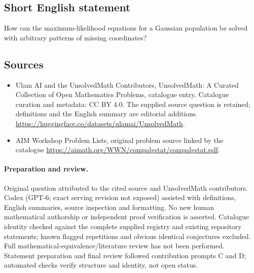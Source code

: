 \documentclass[11pt]{article}
\begin{document}
\subsection{Short English statement}
How can the maximum-likelihood equations for a Gaussian population be solved with arbitrary patterns of missing coordinates?
\subsection{Sources}
\begin{itemize}
\item[\hypertarget{source:statement:1}{S1}] Ulam AI and the UnsolvedMath Contributors, UnsolvedMath: A Curated Collection of Open Mathematics Problems, catalogue entry. Catalogue curation and metadata: CC BY 4.0. The supplied source question is retained; definitions and the English summary are editorial additions.
\url{https://huggingface.co/datasets/ulamai/UnsolvedMath}.
\item[\hypertarget{source:statement:2}{S2}] AIM Workshop Problem Lists, original problem source linked by the catalogue
\url{https://aimath.org/WWN/compalgstat/compalgstat.pdf}.
\end{itemize}
\paragraph{Preparation and review.}
Original question attributed to the cited source and UnsolvedMath contributors. Codex (GPT-6; exact serving revision not exposed) assisted with definitions, English summaries, source inspection and formatting. No new human mathematical authorship or independent proof verification is asserted. Catalogue identity checked against the complete supplied registry and existing repository statements; known flagged repetitions and obvious identical conjectures excluded. Full mathematical-equivalence/literature review has not been performed. Statement preparation and final review followed contribution prompts C and D; automated checks verify structure and identity, not open status.
\label{end:statement}
\end{document}
